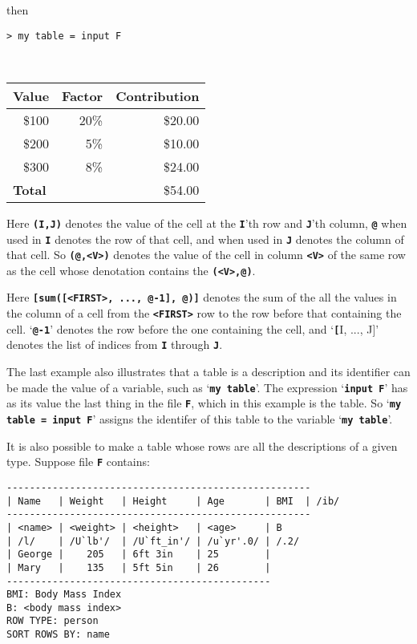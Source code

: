 \documentclass[12pt]{article}
\newcommand{\TT}[1]{{\tt \bfseries #1}}
\newenvironment{indpar}[1][0.3in]%
	{\begin{list}{}%
		     {\setlength{\itemsep}{0in}%
		      \setlength{\topsep}{0in}%
		      \setlength{\parsep}{1ex}%
		      \setlength{\labelwidth}{#1}%
		      \setlength{\leftmargin}{#1}%
		      \addtolength{\leftmargin}{\labelsep}}%
	 \item}%
	{\end{list}}
\begin{document}
then

\verb|> my table = input F| {\raggedright \\}
\begin{center}
\begin{tabular}{|r|r|r|}
\hline
\multicolumn{1}{|c|}{\bf Value} &
\multicolumn{1}{|c|}{\bf Factor} &
\multicolumn{1}{|c|}{\bf Contribution} \\
\hline
\$100 & 20\% & \$20.00 \\
\$200 & 5\%  & \$10.00 \\
\$300 & 8\%  & \$24.00 \\
\hline
\multicolumn{2}{|l|}{\bf Total} & \$54.00 \\
\hline
\end{tabular}
\end{center}

Here \TT{(I,J)} denotes the value of the cell at the
\TT{I}'th row and \TT{J}'th column, \TT{@} when used
in \TT{I} denotes the row of that cell, and when
used in \TT{J} denotes the column of that cell.  So
\TT{(@,<V>)} denotes the value of the cell in column
\TT{<V>} of the same row as the cell whose denotation
contains the \TT{(<V>,@)}.

Here \TT{[sum([<FIRST>, ..., @-1], @)]} denotes the
sum of the all the values in the column of a cell from the
\TT{<FIRST>} row to the row before that containing
the cell.  `\TT{@-1}' denotes the row before the one
containing the cell, and `\TT[I, ..., J]' denotes
the list of indices from \TT{I} through \TT{J}.

The last example also illustrates that a table is a description
and its identifier can be made the value of a variable,
such as `\TT{my table}'.  The expression `\TT{input F}' has
as its value the last thing in the file \TT{F}, which in this
example is the table.  So `\TT{my table = input F}' assigns
the identifer of this table to the variable `\TT{my table}'.

It is also possible to make a table whose rows are all the
descriptions of a given type.  Suppose file \TT{F} contains:
\begin{indpar}\begin{verbatim}
-----------------------------------------------------
| Name   | Weight   | Height     | Age       | BMI  | /ib/
-----------------------------------------------------
| <name> | <weight> | <height>   | <age>     | B
| /l/    | /U`lb'/  | /U`ft_in'/ | /u`yr'.0/ | /.2/
| George |    205   | 6ft 3in    | 25        |
| Mary   |    135   | 5ft 5in    | 26        |
----------------------------------------------
BMI: Body Mass Index
B: <body mass index>
ROW TYPE: person
SORT ROWS BY: name
\end{verbatim}\end{indpar}
\end{document}

